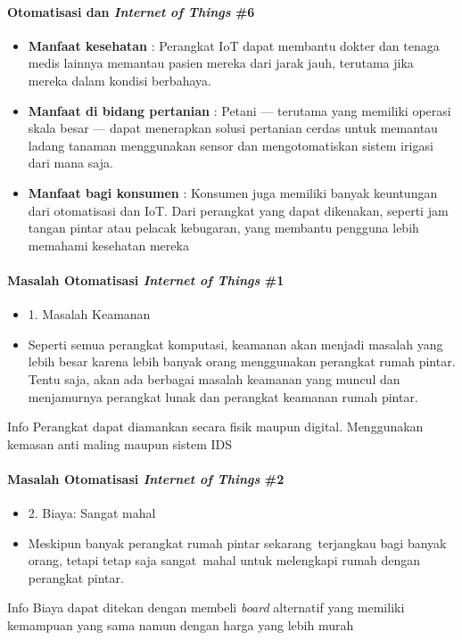 \begin{frame}{\insertsectionhead}
	\framesubtitle{Otomatisasi dan \textit{Internet of Things} \#6}
	\justifying
	\begin{itemize}
		\item \textbf{Manfaat kesehatan} : Perangkat IoT dapat membantu dokter dan tenaga medis lainnya memantau pasien mereka dari jarak jauh, terutama jika mereka dalam kondisi berbahaya. 
		\item \textbf{Manfaat di bidang pertanian} : Petani — terutama yang memiliki operasi skala besar — dapat menerapkan solusi pertanian cerdas untuk memantau ladang tanaman menggunakan sensor dan mengotomatiskan sistem irigasi dari mana saja. 
		\item \textbf{Manfaat bagi konsumen} : Konsumen juga memiliki banyak keuntungan dari otomatisasi dan IoT. Dari perangkat yang dapat dikenakan, seperti jam tangan pintar atau pelacak kebugaran, yang membantu pengguna lebih memahami kesehatan mereka
	\end{itemize}
\end{frame}

\begin{frame}{\insertsectionhead}
	\framesubtitle{Masalah Otomatisasi \textit{Internet of Things} \#1}
	\justifying
	\begin{itemize}
		\item 1. Masalah Keamanan
		\item Seperti semua perangkat komputasi, keamanan akan menjadi masalah yang lebih besar karena lebih banyak orang menggunakan perangkat rumah pintar. Tentu saja, akan ada berbagai masalah keamanan yang muncul dan menjamurnya perangkat lunak dan perangkat keamanan rumah pintar.
	\end{itemize}
	\vfill
	\begin{block}{Info}
		Perangkat dapat diamankan secara fisik maupun digital. Menggunakan kemasan anti maling maupun sistem IDS
	\end{block}
\end{frame}

\begin{frame}{\insertsectionhead}
	\framesubtitle{Masalah Otomatisasi \textit{Internet of Things} \#2}
	\justifying
	\begin{itemize}
		\item 2. Biaya: Sangat mahal
		\item Meskipun banyak perangkat rumah pintar sekarang terjangkau bagi banyak orang, tetapi tetap saja sangat mahal untuk melengkapi rumah dengan perangkat pintar.
	\end{itemize}
	\vfill
	\begin{block}{Info}
		Biaya dapat ditekan dengan membeli \textit{board} alternatif yang memiliki kemampuan yang sama namun dengan harga yang lebih murah
	\end{block}
\end{frame}

